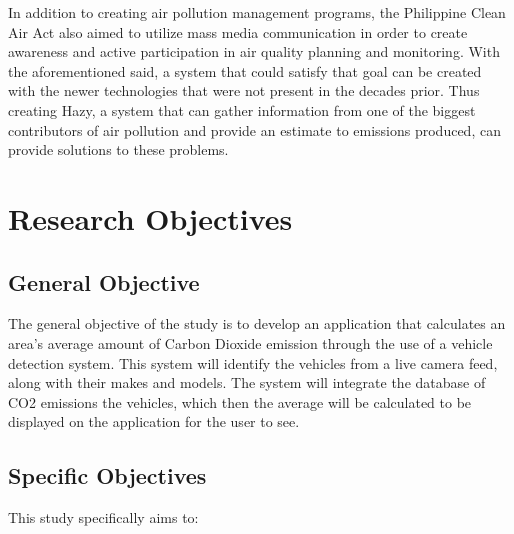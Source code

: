 In addition to creating air pollution management programs, the Philippine Clean Air Act also aimed to utilize mass media communication in order to create awareness and active participation in air quality planning and monitoring. With the aforementioned said, a system that could satisfy that goal can be created with the newer technologies that were not present in the decades prior. Thus creating Hazy, a system that can gather information from one of the biggest contributors of air pollution and provide an estimate to emissions produced, can provide solutions to these problems. 


\section{Research Objectives}
\label{sec:researchobjectives}

\subsection{General Objective}
\label{sec:generalobjective}


The general objective of the study is to develop an application that calculates an area’s average amount of Carbon Dioxide emission through the use of a vehicle detection system. This system will identify the vehicles from a live camera feed, along with their makes and models. The system will integrate the database of CO2 emissions the vehicles, which then the average will be calculated to be displayed on the application for the user to see.



\subsection{Specific Objectives}
\label{sec:specificobjectives}

%
%
This study specifically aims to:


